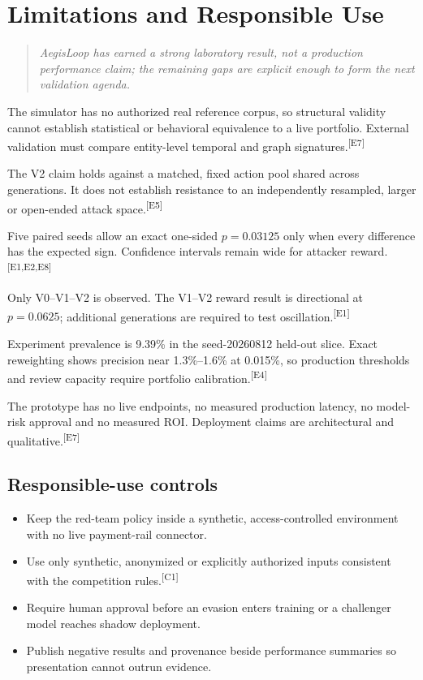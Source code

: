 \documentclass[11pt,a4paper,oneside]{article}
\newcommand{\evidence}[1]{\textsuperscript{\textcolor{EvidenceGray}{[#1]}}}
\newcommand{\competition}{\textsuperscript{\textcolor{EvidenceGray}{[C1]}}}
\newcommand{\sectionlead}[1]{\begin{quote}\itshape #1\end{quote}}
\begin{document}
\section{Limitations and Responsible Use}
\sectionlead{AegisLoop has earned a strong laboratory result, not a production performance claim; the remaining gaps are explicit enough to form the next validation agenda.}

\begin{description}[leftmargin=0pt,labelindent=0pt,style=nextline,font=\bfseries]
  \item[Synthetic-only evidence.] The simulator has no authorized real reference corpus, so structural validity cannot establish statistical or behavioral equivalence to a live portfolio. External validation must compare entity-level temporal and graph signatures.\evidence{E7}\cite{sajja2026synthetic}
  \item[Matched-pool V2 scope.] The V2 claim holds against a matched, fixed action pool shared across generations. It does not establish resistance to an independently resampled, larger or open-ended attack space.\evidence{E5}
  \item[Small seed count.] Five paired seeds allow an exact one-sided $p=0.03125$ only when every difference has the expected sign. Confidence intervals remain wide for attacker reward.\evidence{E1,E2,E8}
  \item[Limited stability horizon.] Only V0--V1--V2 is observed. The V1--V2 reward result is directional at $p=0.0625$; additional generations are required to test oscillation.\evidence{E1}\cite{vangara2024contextual}
  \item[Prevalence transfer.] Experiment prevalence is 9.39\% in the seed-20260812 held-out slice. Exact reweighting shows precision near 1.3\%--1.6\% at 0.015\%, so production thresholds and review capacity require portfolio calibration.\evidence{E4}
  \item[No live-operational proof.] The prototype has no live endpoints, no measured production latency, no model-risk approval and no measured ROI. Deployment claims are architectural and qualitative.\evidence{E7}
\end{description}

\subsection{Responsible-use controls}
\begin{itemize}
  \item Keep the red-team policy inside a synthetic, access-controlled environment with no live payment-rail connector.
  \item Use only synthetic, anonymized or explicitly authorized inputs consistent with the competition rules.\competition
  \item Require human approval before an evasion enters training or a challenger model reaches shadow deployment.
  \item Publish negative results and provenance beside performance summaries so presentation cannot outrun evidence.
\end{itemize}
\end{document}
